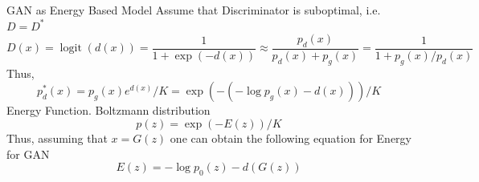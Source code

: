 \documentclass[xcolor=dvipsnames]{beamer}
\begin{document}
    \begin{frame}{GAN as Energy Based Model}
        Assume that Discriminator is suboptimal, i.e. $D = D^*$
        \begin{equation*}
            D(x) = \operatorname*{logit}(d(x)) = \frac{1}{1 + \exp(-d(x))} \approx \frac{p_d(x)}{p_d(x) + p_g(x)}  = \frac{1}{1 + p_g(x)/p_d(x)}
        \end{equation*}
        Thus,
        \begin{equation*}
                p_d^*(x) = p_g(x) e^{d(x)} / K = \exp\left( - (-\log p_g(x) - d(x))\right) / K
        \end{equation*}
        Energy Function. Boltzmann distribution
        \begin{equation*}
            p(z) = \exp(-E(z)) / K 
        \end{equation*}
        Thus, assuming that $x = G(z)$ one can obtain the following equation for Energy for GAN
        \begin{equation*}
            E(z) = -\log p_0(z) - d(G(z))
        \end{equation*}
    \end{frame}
\end{document}
